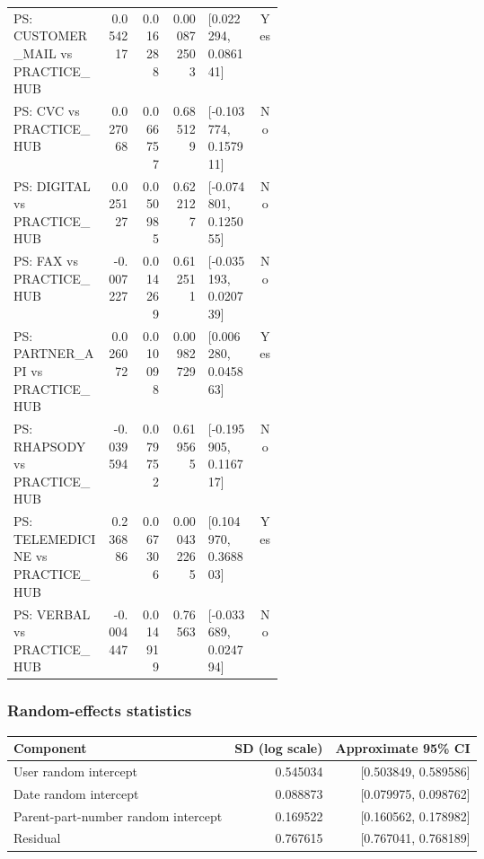 \begin{longtable}{@{}p{0.35\linewidth}rrrlc@{}}
\rowcolor{yellow!35} PS: CUSTOMER\_MAIL vs PRACTICE\_HUB & 0.054217 & 0.016288 & 0.000872503 & [0.022294, 0.086141] & Yes \\
PS: CVC vs PRACTICE\_HUB & 0.027068 & 0.066757 & 0.685129 & [-0.103774, 0.157911] & No \\
PS: DIGITAL vs PRACTICE\_HUB & 0.025127 & 0.050985 & 0.622127 & [-0.074801, 0.125055] & No \\
PS: FAX vs PRACTICE\_HUB & -0.007227 & 0.014269 & 0.612511 & [-0.035193, 0.020739] & No \\
\rowcolor{yellow!35} PS: PARTNER\_API vs PRACTICE\_HUB & 0.026072 & 0.010098 & 0.00982729 & [0.006280, 0.045863] & Yes \\
PS: RHAPSODY vs PRACTICE\_HUB & -0.039594 & 0.079752 & 0.619565 & [-0.195905, 0.116717] & No \\
\rowcolor{yellow!35} PS: TELEMEDICINE vs PRACTICE\_HUB & 0.236886 & 0.067306 & 0.000432265 & [0.104970, 0.368803] & Yes \\
PS: VERBAL vs PRACTICE\_HUB & -0.004447 & 0.014919 & 0.76563 & [-0.033689, 0.024794] & No \\
\end{longtable}
\endgroup

\subsubsection{Random-effects statistics}
\begin{center}
\begin{tabular}{@{}lrr@{}}
\toprule
Component & SD (log scale) & Approximate 95\% CI \\
\midrule
User random intercept & 0.545034 & [0.503849, 0.589586] \\
Date random intercept & 0.088873 & [0.079975, 0.098762] \\
Parent-part-number random intercept & 0.169522 & [0.160562, 0.178982] \\
Residual & 0.767615 & [0.767041, 0.768189] \\
\bottomrule
\end{tabular}
\end{center}


